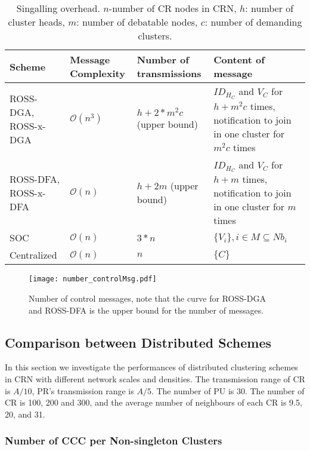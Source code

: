 \documentclass[journal,comsoc]{IEEEtran}
\theoremstyle{mytheoremstyle}
\theoremstyle{mytheoremstyle}
\theoremstyle{mytheoremstyle}
\begin{document}
\begin{center}
\begin{table*}[ht]
\caption{Singalling overhead. $n$-number of CR nodes in CRN, $h$: number of cluster heads, $m$: number of debatable nodes, $c$: number of demanding clusters.}\label{tab_overhead}
{\small
\hfill{}
\begin{tabular}{|p{2.2 cm}|p{3 cm}|p{3.5 cm}|p{7 cm}|}
\hline
 Scheme 				&Message Complexity 	&   Number of transmissions 					& Content of message \\ \hline
 ROSS-DGA, ROSS-x-DGA 	&$\mathcal{O}(n^3)$	&   $h+2*m^2c$ (upper bound)
				& $ID_{H_C}$ and $V_C$ for $h+m^2c$ times, notification to join in one cluster for $m^2c$ times					\\ \hline
 ROSS-DFA, ROSS-x-DFA 	&$\mathcal{O}(n)$	&   $h+ 2m$	 (upper bound) 						& $ID_{H_C}$ and $V_C$ for $h+m$ times, notification to join in one cluster for $m$ times	 					\\ \hline
 SOC 					&$\mathcal{O}(n)$	&   $3*n$					& $\{V_i\}, i\in M\subseteq Nb_i$						\\ \hline
 Centralized			&$\mathcal{O}(n)$	&	$n$						& $\{C\}$         	\\ 
 \hline
\end{tabular}
}
\hfill{}
\end{table*}
\end{center}




\begin{figure}[ht!]
  \centering
  \texttt{[image: number\_controlMsg.pdf]}
  \caption{Number of control messages, note that the curve for ROSS-DGA and ROSS-DFA is the upper bound for the number of messages.}
  \label{control_msg}
\end{figure}


\subsection{Comparison between Distributed Schemes}
In this section we investigate the performances of distributed clustering schemes in CRN with different network scales and densities.
The transmission range of CR is $A/10$, PR's transmission range is $A/5$.
The number of PU is 30.
The number of CR is 100, 200 and 300, and the average number of neighbours of each CR is 9.5, 20, and 31.


\subsubsection{Number of CCC per Non-singleton Clusters}
\end{document}
